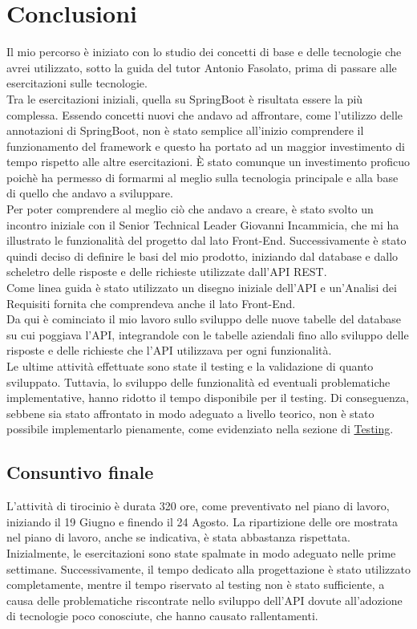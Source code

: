 \chapter{Conclusioni}
\label{cap:conclusioni}

Il mio percorso è iniziato con lo studio dei concetti di base e delle tecnologie che avrei utilizzato, sotto la guida del tutor Antonio Fasolato, prima di passare alle esercitazioni sulle tecnologie.\\
Tra le esercitazioni iniziali, quella su SpringBoot è risultata essere la più complessa. Essendo concetti nuovi che andavo ad affrontare, come l'utilizzo delle annotazioni di SpringBoot, non è stato semplice all’inizio comprendere il funzionamento del framework e questo ha portato ad un maggior investimento di tempo rispetto alle altre esercitazioni. È stato comunque un investimento proficuo poichè ha permesso di formarmi al meglio sulla tecnologia principale e alla base di quello che andavo a sviluppare.\\
Per poter comprendere al meglio ciò che andavo a creare, è stato svolto un incontro iniziale con il Senior Technical Leader Giovanni Incammicia, che mi ha illustrato le funzionalità del progetto dal lato Front-End. Successivamente è stato quindi deciso di definire le basi del mio prodotto, iniziando dal database e dallo scheletro delle risposte e delle richieste utilizzate dall’API REST.\\
Come linea guida è stato utilizzato un disegno iniziale dell’API e un'Analisi dei Requisiti fornita che comprendeva anche il lato Front-End.\\
Da qui è cominciato il mio lavoro sullo sviluppo delle nuove tabelle del database su cui poggiava l’API, integrandole con le tabelle aziendali fino allo sviluppo delle risposte e delle richieste che l’API utilizzava per ogni funzionalità.\\
Le ultime attività effettuate sono state il testing e la validazione di quanto sviluppato. Tuttavia, lo sviluppo delle funzionalità ed eventuali problematiche implementative, hanno ridotto il tempo disponibile per il testing. Di conseguenza, sebbene sia stato affrontato in modo adeguato a livello teorico, non è stato possibile implementarlo pienamente, come evidenziato nella sezione di \hyperlink{testing}{Testing}.

\section{Consuntivo finale}
L’attività di tirocinio è durata 320 ore, come preventivato nel piano di lavoro, iniziando il 19 Giugno e finendo il 24 Agosto. La ripartizione delle ore mostrata nel piano di lavoro, anche se indicativa, è stata abbastanza rispettata.\\
Inizialmente, le esercitazioni sono state spalmate in modo adeguato nelle prime settimane. Successivamente, il tempo dedicato alla progettazione è stato utilizzato completamente, mentre il tempo riservato al testing non è stato sufficiente, a causa delle problematiche riscontrate nello sviluppo dell'API dovute all'adozione di tecnologie poco conosciute, che hanno causato rallentamenti.

